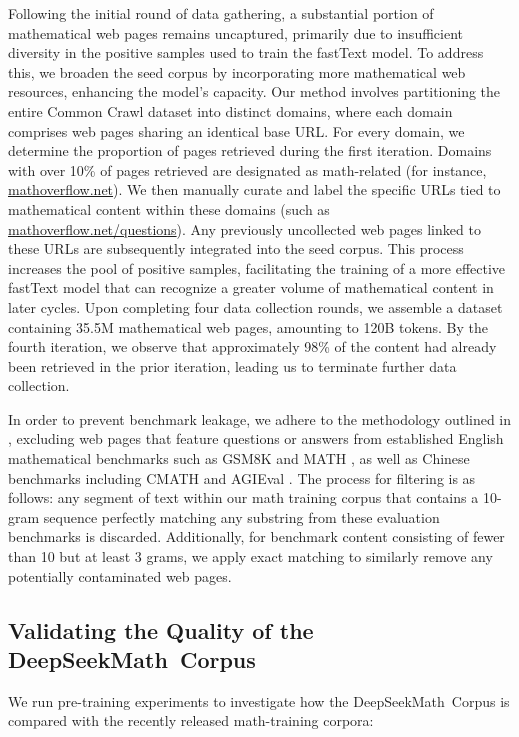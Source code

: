 \begin{itemize}[topsep=0pt]
Following the initial round of data gathering, a substantial portion of mathematical web pages remains uncaptured, primarily due to insufficient diversity in the positive samples used to train the fastText model. To address this, we broaden the seed corpus by incorporating more mathematical web resources, enhancing the model's capacity. Our method involves partitioning the entire Common Crawl dataset into distinct domains, where each domain comprises web pages sharing an identical base URL. For every domain, we determine the proportion of pages retrieved during the first iteration. Domains with over 10\% of pages retrieved are designated as math-related (for instance, \url{mathoverflow.net}). We then manually curate and label the specific URLs tied to mathematical content within these domains (such as \url{mathoverflow.net/questions}). Any previously uncollected web pages linked to these URLs are subsequently integrated into the seed corpus. This process increases the pool of positive samples, facilitating the training of a more effective fastText model that can recognize a greater volume of mathematical content in later cycles. Upon completing four data collection rounds, we assemble a dataset containing 35.5M mathematical web pages, amounting to 120B tokens. By the fourth iteration, we observe that approximately 98\% of the content had already been retrieved in the prior iteration, leading us to terminate further data collection.

In order to prevent benchmark leakage, we adhere to the methodology outlined in \cite{deepseek-coder}, excluding web pages that feature questions or answers from established English mathematical benchmarks such as GSM8K \citep{gsm8k} and MATH \citep{MATH}, as well as Chinese benchmarks including CMATH \citep{wei2023cmath} and AGIEval \citep{agieval}. The process for filtering is as follows: any segment of text within our math training corpus that contains a 10-gram sequence perfectly matching any substring from these evaluation benchmarks is discarded. Additionally, for benchmark content consisting of fewer than 10 but at least 3 grams, we apply exact matching to similarly remove any potentially contaminated web pages.

\subsection{Validating the Quality of the DeepSeekMath~Corpus}

We run pre-training experiments to investigate how the DeepSeekMath~Corpus is compared with the recently released math-training corpora:


\end{itemize}
